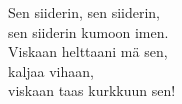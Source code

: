 
            Sen siiderin, sen siiderin, \\
            sen siiderin kumoon imen. \\
            Viskaan helttaani mä sen, \\
            kaljaa vihaan, \\
            viskaan taas kurkkuun sen! \\
